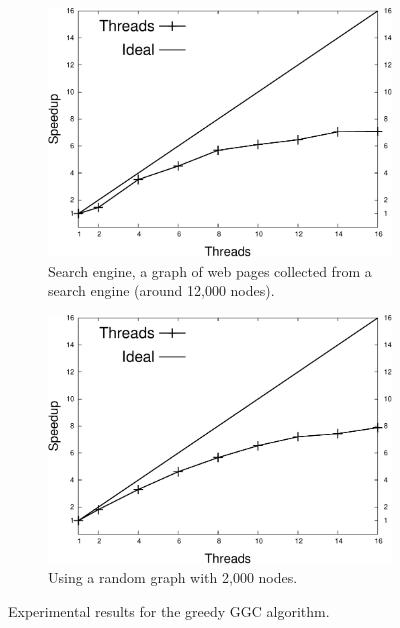 \begin{figure}[hp]
   \centering
   \begin{subfigure}[b]{0.45\textwidth}
      \includegraphics[width=\textwidth]{new-benchmarks/speedup_greedy-graph-coloring-search_engines.pdf}
      \caption{Search engine, a graph of web pages collected from a search engine (around 12,000 nodes).}
   \end{subfigure}
   \begin{subfigure}[b]{0.45\textwidth}
      \includegraphics[width=\textwidth]{new-benchmarks/speedup_greedy-graph-coloring-2000.pdf}
      \caption{Using a random graph with 2,000 nodes.\newline}
   \end{subfigure}
   \caption{Experimental results for the greedy GGC algorithm.}
   \label{exp:graph_coloring}
\end{figure}

